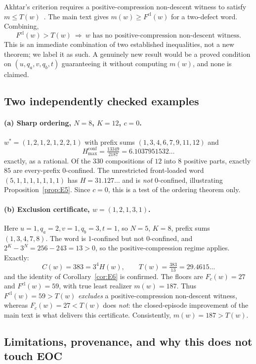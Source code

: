 \documentclass[11pt,a4paper]{article}
\theoremstyle{plain}
\theoremstyle{definition}
\newcommand{\Fc}{F_{c}}
\newcommand{\Fcl}{F^{\mathrm{cl}}}
\begin{document}
Akhtar's criterion requires a positive-compression non-descent witness to
satisfy $m\le T(w)$~\cite[Prop.~13]{akhtar2026}. The main text gives
$m(w)\ge\Fcl(w)$ for a two-defect word. Combining,
\[
\boxed{\ \Fcl(w)>T(w)\ \Longrightarrow\ \text{$w$ has no
positive-compression non-descent witness.}\ }
\]
This is an immediate combination of two established inequalities, not a new
theorem; we label it as such. A genuinely new result would be a proved
condition on $(u,q_a,v,q_b,t)$ guaranteeing it without computing $m(w)$, and
none is claimed.

\subsection{Two independently checked examples}

\paragraph{(a) Sharp ordering, $N=8$, $K=12$, $c=0$.}
$w^{*}=(1,2,1,2,1,2,2,1)$ with prefix sums $(1,3,4,6,7,9,11,12)$ and
\[
H^{\mathrm{conf}}_{\max}=\tfrac{13349}{2187}=6.1037951532\ldots
\]
exactly, as a rational. Of the $330$ compositions of $12$ into $8$ positive
parts, exactly $85$ are every-prefix $0$-confined. The unrestricted
front-loaded word $(5,1,1,1,1,1,1,1)$ has $H=31.127\ldots$ and is \emph{not}
$0$-confined, illustrating Proposition~\ref{prop:E5}. Since $c=0$, this is a
test of the ordering theorem only.

\paragraph{(b) Exclusion certificate, $w=(1,2,1,3,1)$.}
Here $u=1,q_a=2,v=1,q_b=3,t=1$, so $N=5$, $K=8$, prefix sums $(1,3,4,7,8)$.
The word is $1$-confined but not $0$-confined, and $2^{K}-3^{N}=256-243=13>0$,
so the positive-compression regime applies. Exactly:
\[
C(w)=383=3^{4}H(w),\qquad T(w)=\tfrac{383}{13}=29.4615\ldots
\]
and the identity of Corollary~\ref{cor:E6} is confirmed. The floors are
$\Fc(w)=27$ and $\Fcl(w)=59$, with true least realizer $m(w)=187$. Thus
$\Fcl(w)=59>T(w)$ \emph{excludes} a positive-compression non-descent witness,
whereas $\Fc(w)=27<T(w)$ does \emph{not}: the closed-episode improvement of
the main text is what delivers this certificate. Consistently, $m(w)=187>T(w)$.

\subsection{Limitations, provenance, and why this does not touch EOC}
\end{document}
